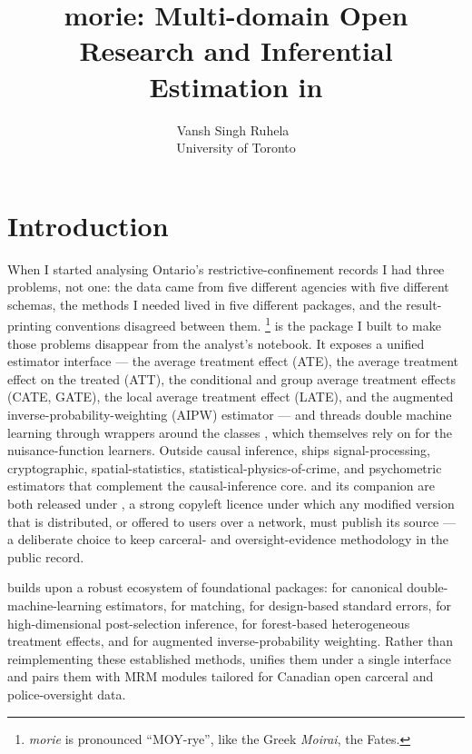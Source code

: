 \documentclass[article,shortnames,nojss]{jss}
\title{morie: Multi-domain Open Research and Inferential Estimation in \proglang{R}}
\author{Vansh Singh Ruhela~\orcidlink{0009-0004-1750-3592}\\University of Toronto}
\begin{document}
\sloppy

\section{Introduction}
\label{sec:intro}

When I started analysing Ontario's restrictive-confinement
records I had three problems, not one: the data came from five
different agencies with five different schemas, the methods I
needed lived in five different  packages, and the
result-printing conventions disagreed between them.
\footnote{\textit{morie} is pronounced ``MOY-rye'',
like the Greek \textit{Moirai}, the Fates.} is the
 package I built to make those problems disappear
from the analyst's notebook. It exposes a unified estimator
interface --- the average treatment effect (ATE), the average
treatment effect on the treated (ATT), the conditional and
group average treatment effects (CATE, GATE), the local
average treatment effect (LATE), and the augmented
inverse-probability-weighting (AIPW) estimator --- and threads
double machine learning through wrappers around the
 classes \citep{Bach2024DoubleML}, which
themselves rely on  \citep{Lang2019mlr3} for the
nuisance-function learners. Outside causal inference,
 ships signal-processing, cryptographic,
spatial-statistics, statistical-physics-of-crime, and
psychometric estimators that complement the causal-inference
core.  and its  companion
\citep{Ruhela2026MoriePy} are both released under
, a strong copyleft licence under which
any modified version that is distributed, or offered to users
over a network, must publish its source --- a deliberate
choice to keep carceral- and oversight-evidence methodology in
the public record.

 builds upon a robust ecosystem of foundational
packages:  \citep{Bach2024DoubleML} for canonical
double-machine-learning estimators,  for matching,
 for design-based standard errors, 
\citep{ChernozhukovHansenSpindler2016hdm} for high-dimensional
post-selection inference,  for forest-based
heterogeneous treatment effects, and  for augmented
inverse-probability weighting. Rather than reimplementing
these established methods,  unifies them under a
single interface and pairs them with MRM modules tailored for
Canadian open carceral and police-oversight data.
\end{document}

